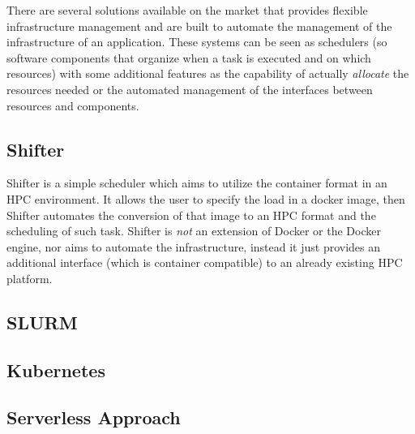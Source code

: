 There are several solutions available on the market that provides flexible infrastructure management and are built to automate the management of the infrastructure of an application. These systems can be seen as schedulers (so software components that organize when a task is executed and on which resources) with some additional features as the capability of actually \textit{allocate} the resources needed or the automated management of the interfaces between resources and components.

\subsection{Shifter}
\label{sse:shifter}
  Shifter is a simple scheduler which aims to utilize the container format in an HPC environment. It allows the user to specify the load in a docker image, then Shifter automates the conversion of that image to an HPC format and the scheduling of such task. Shifter is \textit{not} an extension of Docker or the Docker engine, nor aims to automate the infrastructure, instead it just provides an additional interface (which is container compatible) to an already existing HPC platform.

\subsection{SLURM}
\label{sse:slurm}

\subsection{Kubernetes}
\label{sse:kubernetes}

\subsection{Serverless Approach}
\label{sse:serverless}

